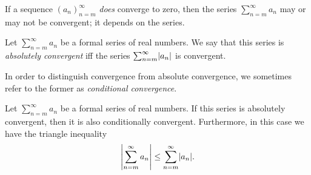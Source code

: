 \begin{note}
  If a sequence \((a_n)_{n = m}^\infty\) \emph{does} converge to zero, then the series \(\sum_{n = m}^\infty a_n\) may or may not be convergent;
  it depends on the series.
\end{note}

\setcounter{thm}{7}
\begin{defn}\label{7.2.8}
  Let \(\sum_{n = m}^\infty a_n\) be a formal series of real numbers.
  We say that this series is \emph{absolutely convergent} iff the series \(\sum_{n = m}^\infty \abs{a_n}\) is convergent.
\end{defn}

\begin{note}
  In order to distinguish convergence from absolute convergence, we sometimes refer to the former as \emph{conditional convergence}.
\end{note}

\begin{prop}\label{7.2.9}
  Let \(\sum_{n = m}^\infty a_n\) be a formal series of real numbers.
  If this series is absolutely convergent, then it is also conditionally convergent.
  Furthermore, in this case we have the triangle inequality
  \[
    \abs{\sum_{n = m}^\infty a_n} \leq \sum_{n = m}^\infty \abs{a_n}.
  \]
\end{prop}

